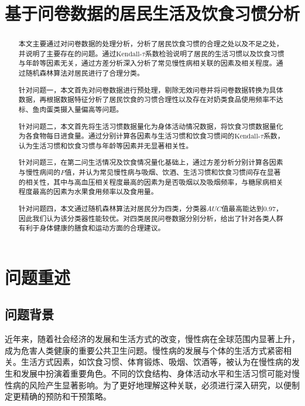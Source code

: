 \documentclass[withoutpreface,bwprint]{cumcmthesis} %
\title{基于问卷数据的居民生活及饮食习惯分析}
\begin{document}
 \maketitle
 \begin{abstract}
本文主要通过对问卷数据的处理分析，分析了居民饮食习惯的合理之处以及不足之处，并说明了主要存在的问题。通过$\text{Kendall-}\tau$系数检验说明了居民的生活习惯以及饮食习惯与年龄等因素无关，通过方差分析深入分析了常见慢性病相关联的因素及相关程度。通过随机森林算法对居民进行了合理分类。

针对问题一，本文首先对问卷数据进行预处理，剔除无效问卷并将问卷数据转换为具体数据，再根据数据特征分析了居民饮食的习惯合理性以及存在对奶类食品使用频率不达标、鱼肉蛋类摄入量偏高等问题。

针对问题二，本文首先将生活习惯数据量化为身体活动情况数据，将饮食习惯数据量化为各食物每日进食量。通过分别计算各因素与生活习惯和饮食习惯间的$\text{Kendall-}\tau$系数，认为生活习惯和饮食习惯与年龄等因素并无显著相关性。

针对问题三，在第二问生活情况及饮食情况量化基础上，通过方差分析分别计算各因素与慢性病间的$F$值，并认为常见慢性病与吸烟、饮酒、生活习惯和饮食习惯间存在显著的相关性，其中与高血压相关程度最高的因素为是否吸烟以及吸烟频率，与糖尿病相关程度最高的因素为水果食用频率以及食用量。

针对问题四，本文通过随机森林算法对居民分为四类，分类器$AUC$值最高能达到0.97，因此我们认为该分类器性能较优。对四类居民问卷数据分别分析，给出了针对各类人群有利于身体健康的膳食和运动方面的合理建议。

\end{abstract}

\tableofcontents

















\clearpage
\section{问题重述}
\subsection{问题背景}
近年来，随着社会经济的发展和生活方式的改变，慢性病在全球范围内显著上升，成为危害人类健康的重要公共卫生问题。慢性病的发展与个体的生活方式紧密相关。生活方式因素，如饮食习惯、体育锻炼、吸烟、饮酒等，被认为在慢性病的发生和发展中扮演着重要角色。不同的饮食结构、身体活动水平和生活习惯可能对慢性病的风险产生显著影响。为了更好地理解这种关联，必须进行深入研究，以便制定更精确的预防和干预策略。
\end{document}
